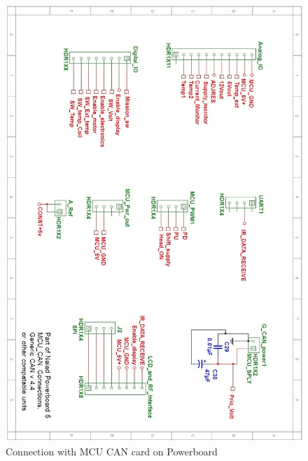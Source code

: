 \begin{figure}[!ht]
	\begin{center}
		\includegraphics[width=13.2cm]{./Images/Powerboard_Scematics/MCU_CAN.jpg}
		\caption{Connection with MCU CAN card on Powerboard}
	\end{center}
\end{figure}

